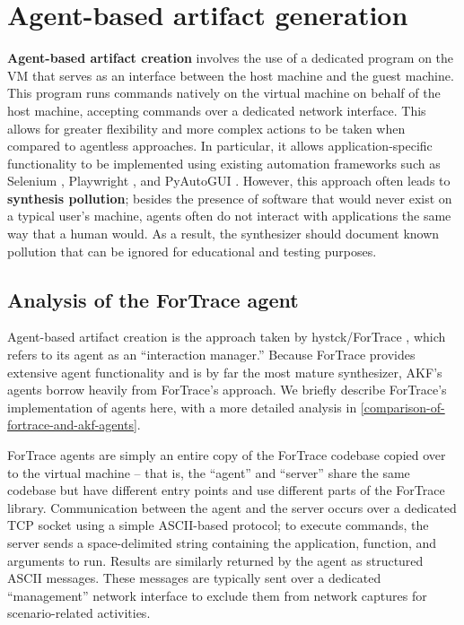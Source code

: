 \documentclass[letterpaper,12pt]{report}
\begin{document}
\section{Agent-based artifact
generation}\label{agent-based-artifact-generation}

\textbf{Agent-based artifact creation} involves the use of a dedicated
program on the VM that serves as an interface between the host machine
and the guest machine. This program runs commands natively on the
virtual machine on behalf of the host machine, accepting commands over a
dedicated network interface. This allows for greater flexibility and
more complex actions to be taken when compared to agentless approaches.
In particular, it allows application-specific functionality to be
implemented using existing automation frameworks such as Selenium
\cite{SeleniumHQSelenium2025}, Playwright
\cite{MicrosoftPlaywrightpython2025}, and PyAutoGUI
\cite{sweigartAsweigartPyautogui2025}. However, this approach often
leads to \textbf{synthesis pollution}; besides the presence of software
that would never exist on a typical user's machine, agents often do not
interact with applications the same way that a human would. As a result,
the synthesizer should document known pollution that can be ignored for
educational and testing purposes.

\subsection{Analysis of the ForTrace
agent}\label{analysis-of-the-fortrace-agent}

Agent-based artifact creation is the approach taken by hystck/ForTrace
\cite{gobelNovelApproachGenerating2020,gobelForTraceHolisticForensic2022},
which refers to its agent as an ``interaction manager.'' Because
ForTrace provides extensive agent functionality and is by far the most
mature synthesizer, AKF's agents borrow heavily from ForTrace's
approach. We briefly describe ForTrace's implementation of agents here,
with a more detailed analysis in \autoref{comparison-of-fortrace-and-akf-agents}.

ForTrace agents are simply an entire copy of the ForTrace codebase
copied over to the virtual machine -- that is, the ``agent'' and
``server'' share the same codebase but have different entry points and
use different parts of the ForTrace library. Communication between the
agent and the server occurs over a dedicated TCP socket using a simple
ASCII-based protocol; to execute commands, the server sends a
space-delimited string containing the application, function, and
arguments to run. Results are similarly returned by the agent as
structured ASCII messages. These messages are typically sent over a
dedicated ``management'' network interface to exclude them from network
captures for scenario-related activities.
\end{document}

